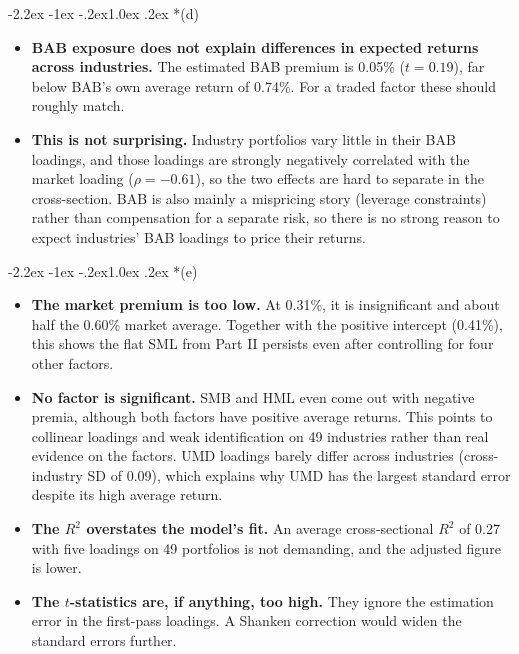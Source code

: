 \documentclass[11pt]{article}
\makeatletter
\renewcommand\subsection{\@startsection{subsection}{2}{0pt}%
  {-2.2ex \@plus -1ex \@minus -.2ex}{1.0ex \@plus .2ex}%
  {\normalfont\bfseries\normalsize\color{psink}}}
\makeatother
\begin{document}
\subsection*{(d)}
\begin{itemize}
  \item \textbf{BAB exposure does not explain differences in expected returns across industries.} The estimated BAB premium is 0.05\% ($t=0.19$), far below BAB's own average return of 0.74\%. For a traded factor these should roughly match.
  \item \textbf{This is not surprising.} Industry portfolios vary little in their BAB loadings, and those loadings are strongly negatively correlated with the market loading ($\rho=-0.61$), so the two effects are hard to separate in the cross-section. BAB is also mainly a mispricing story (leverage constraints) rather than compensation for a separate risk, so there is no strong reason to expect industries' BAB loadings to price their returns.
\end{itemize}

\subsection*{(e)}
\begin{itemize}
  \item \textbf{The market premium is too low.} At 0.31\%, it is insignificant and about half the 0.60\% market average. Together with the positive intercept (0.41\%), this shows the flat SML from Part II persists even after controlling for four other factors.
  \item \textbf{No factor is significant.} SMB and HML even come out with negative premia, although both factors have positive average returns. This points to collinear loadings and weak identification on 49 industries rather than real evidence on the factors. UMD loadings barely differ across industries (cross-industry SD of 0.09), which explains why UMD has the largest standard error despite its high average return.
  \item \textbf{The $R^2$ overstates the model's fit.} An average cross-sectional $R^2$ of 0.27 with five loadings on 49 portfolios is not demanding, and the adjusted figure is lower.
  \item \textbf{The $t$-statistics are, if anything, too high.} They ignore the estimation error in the first-pass loadings. A Shanken correction would widen the standard errors further.
\end{itemize}
\end{document}
